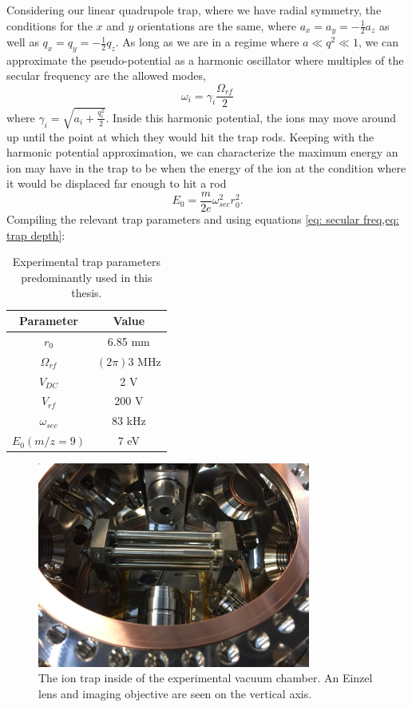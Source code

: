 Considering our linear quadrupole trap, where we have radial symmetry, the conditions for the $x$ and $y$ orientations are the same, where $a_x = a_y = -\frac{1}{2}a_z$ as well as $q_x = q_y = -\frac{1}{2}q_z$. As long as we are in a regime where $a \ll q^2 \ll 1$, we can approximate the pseudo-potential as a harmonic oscillator where multiples of the secular frequency are the allowed modes,
\begin{equation}
	\omega_i = \gamma_i \frac{\Omega_{rf}}{2}
	\label{eq: secular freq}
\end{equation}
where $\gamma_i = \sqrt{a_i + \frac{q_i^2}{2}}$. Inside this harmonic potential, the ions may move around up until the point at which they would hit the trap rods. Keeping with the harmonic potential approximation, we can characterize the maximum energy an ion may have in the trap to be when the energy of the ion at the condition where it would be displaced far enough to hit a rod
\begin{equation}
	E_0 = \frac{m}{2e} \omega_{sec}^2r_0^2.
	\label{eq: trap depth}
\end{equation}
Compiling the relevant trap parameters and using equations \cref{eq: secular freq,eq: trap depth}:

\begin{table}[H]
	\centering
	\begin{tabular}{|c|c|}
		\hline
		Parameter & Value \\
		\hline
		$r_0$ & 6.85 mm \\
		$\Omega_{rf}$ & $(2 \pi) 3$ MHz \\
		$V_{DC}$ & 2 V \\
		$V_{rf}$ & 200 V \\
		$\omega_{sec}$ & 83 kHz \\
		$E_0(m/z=9)$ & 7 eV \\
		\hline
	\end{tabular}
	\caption{Experimental trap parameters predominantly used in this thesis.}
	\label{tab: trap params}
\end{table}

\begin{figure}[H]
	\centering
	\includegraphics[width=0.8\textwidth]{images/ion_trap.jpg}
	\caption{The ion trap inside of the experimental vacuum chamber. An Einzel lens and imaging objective are seen on the vertical axis.}
\end{figure}

